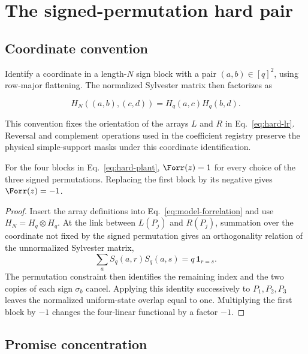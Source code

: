 \section{The signed-permutation hard pair}
\label{app:hard-pair}

\subsection{Coordinate convention}

Identify a coordinate in a length-$N$ sign block with a pair $(a,b)\in[q]^2$, using row-major flattening. The normalized Sylvester matrix then factorizes as

\begin{equation}
H_N((a,b),(c,d))=H_q(a,c)H_q(b,d).
\end{equation}

This convention fixes the orientation of the arrays $L$ and $R$ in Eq.~\eqref{eq:hard-lr}. Reversal and complement operations used in the coefficient registry preserve the physical simple-support masks under this coordinate identification.

\begin{lemma}
For the four blocks in Eq.~\eqref{eq:hard-plant}, $\Forr(z)=1$ for every choice of the three signed permutations. Replacing the first block by its negative gives $\Forr(z)=-1$.
\end{lemma}

\begin{proof}
Insert the array definitions into Eq.~\eqref{eq:model-forrelation} and use $H_N=H_q\otimes H_q$. At the link between $L(P_j)$ and $R(P_j)$, summation over the coordinate not fixed by the signed permutation gives an orthogonality relation of the unnormalized Sylvester matrix,
\begin{equation}
\sum_a S_q(a,r)S_q(a,s)=q\,\mathbf 1_{r=s}.
\end{equation}
The permutation constraint then identifies the remaining index and the two copies of each sign $\sigma_b$ cancel. Applying this identity successively to $P_1,P_2,P_3$ leaves the normalized uniform-state overlap equal to one. Multiplying the first block by $-1$ changes the four-linear functional by a factor $-1$.
\end{proof}

\subsection{Promise concentration}

